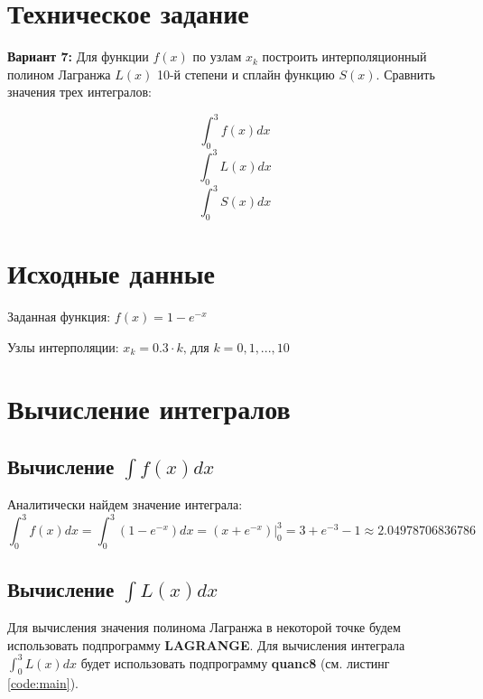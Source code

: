 





\section{Техническое задание}

\textbf{Вариант 7:} Для функции $f(x)$ по узлам $x_k$ построить интерполяционный полином Лагранжа $L(x)$ 10-й степени и сплайн функцию $S(x)$. Сравнить значения трех интегралов:

\begin{multicols}{3}
	\noindent 
	\[\int_0^3 f(x)dx\]
	\[\int_0^3 L(x)dx\]
	\[\int_0^3 S(x)dx\]
\end{multicols}

\section{Исходные данные}

Заданная функция: $f(x) = 1 - e^{-x}$

\vspace{0.3cm}

Узлы интерполяции: $x_k = 0.3 \cdot k\text{, для }k = 0, 1, ..., 10$

\section{Вычисление интегралов}

\subsection{Вычисление $\int f(x)dx$}

Аналитически найдем значение интеграла:
\vspace{-0.2cm}
\[
\int_0^3 f(x)dx = \int_0^3 \left(1 - e^{-x}\right) dx = \left.\left( x + e^{-x} \right)\right\vert_0^3 = 3 + e^{-3} - 1 \approx 2.04978706836786
\]

\subsection{Вычисление $\int L(x)dx$}

Для вычисления значения полинома Лагранжа в некоторой точке будем использовать подпрограмму \textbf{LAGRANGE}. Для вычисления интеграла $\int_0^3 L(x)dx$ будет использовать подпрограмму \textbf{quanc8} (см. листинг \ref{code:main}).

